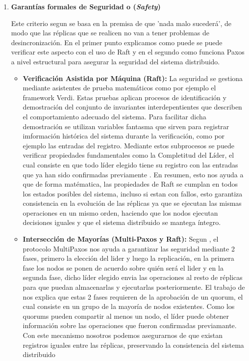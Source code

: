 \documentclass[12pt,letterpaper]{article}
\begin{document}
\begin{enumerate}
    \item \textbf{Garantías formales de Seguridad o (\textit{Safety})}

    Este criterio segun \cite{woos2016} se basa en la premisa de que 'nada malo sucederá', de modo que las réplicas que se realicen no van a tener problemas de desincronización. En el primer punto explicamos como puede se puede verificar este aspecto con el uso de Raft y en el segundo como funciona Paxos a nivel estructural para asegurar la seguridad del sistema distribuido.
    
    \begin{itemize}
        \item \textbf{Verificación Asistida por Máquina (Raft):} La seguridad se gestiona mediante asistentes de prueba matemáticos como por ejemplo el framework Verdi. Estas pruebas aplican procesos de identificación y demostración del conjunto de invariantes interdepentientes que describen el comportamiento adecuado del sistema. Para facilitar dicha demostración se utilizan variables fantasma que sirven para registrar imformación histórica del sistema durante la verificación, como por ejemplo las entradas del registro. Mediante estos subprocesos se puede verificar propiedades fundamentales como la Completitud del Líder, el cual consiste en que todo líder elegido tiene su registro con las entradas que ya han sido confirmadas previamente \cite{woos2016}. En resumen, esto nos ayuda a que de forma matématica, las propiedades de Raft se cumplan en todos los estados posibles del sistema, incluso si estan con fallos, esto garantiza consistencia en la evolución de las réplicas ya que se ejecutan las mismas operaciones en un mismo orden, haciendo que los nodos ejecutan decisiones iguales y que el sistema distribuido se mantega íntegro.
        
        
        \item \textbf{Intersección de Mayorías (Multi-Paxos y Raft):} Segun \cite{liang2025}, el protocolo MultiPaxos nos ayuda a garantizar las seguridad mediante 2 fases, primero la elección del lider y luego la replicación, en la primera fase los nodos se ponen de acuerdo sobre quién será el lider y en la segunda fase, dicho líder elegido envia las operaciones al resto de réplicas para que puedan almacenarlas y ejecutarlas posteriormente. El trabajo de \cite{liang2025} nos explica que estas 2 fases requieren de la aprobación de un quorum, el cual consiste en un grupo de la mayoría de nodos existentes. Como los quorums pueden compartir al menos un nodo, el líder puede obtener información sobre las operaciones que fueron confirmadas previamante. Con este mecanismo nosotros podemos asegurarnos de que existan registros iguales entre las réplicas, preservando la consistencia del sistema distribuido


\end{itemize}
\end{enumerate}
\end{document}
